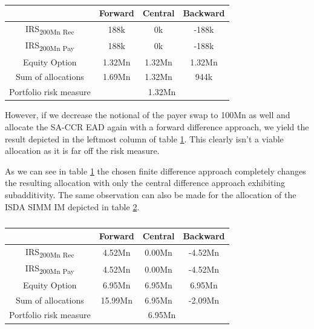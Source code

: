 \documentclass[../Thesis_AHoecherl.tex]{subfiles}
\begin{document}
    \begin{table}[htbp]
        \centering
        \begin{tabular}{c|c|c|c}
            & Forward & Central & Backward \\
            \toprule
            IRS\textsubscript{200Mn Rec} & 188k & 0k & -188k \\
            \midrule
                IRS\textsubscript{200Mn Pay} & 188k & 0k & -188k\\
                \midrule
                Equity Option & 1.32Mn & 1.32Mn & 1.32Mn\\
                \bottomrule
                Sum of allocations & 1.69Mn & 1.32Mn & 944k \\
                \midrule
                Portfolio risk measure & \multicolumn{3}{c}{1.32Mn} \\
            \end{tabular}%
            \caption{}
            \label{tab:EAD perfect hedge}
    \end{table}

    However, if we decrease the notional of the payer swap to 100Mn as well and allocate the SA-CCR EAD again with a forward difference approach, we yield the result depicted in the leftmost column of table \ref{tab:EAD perfect hedge}. This clearly isn't a viable allocation as it is far off the risk measure.
    
    As we can see in table \ref{tab:EAD perfect hedge} the chosen finite difference approach completely changes the resulting allocation with only the central difference approach exhibiting subadditivity.
    The same observation can also be made for the allocation of the ISDA SIMM IM depicted in table \ref{tab:IM perfect hedge}.
    \begin{table}[htbp]
        \centering
        \begin{tabular}{c|c|c|c}
            & Forward & Central & Backward \\
            \toprule
            IRS\textsubscript{200Mn Rec} & 4.52Mn & 0.00Mn & -4.52Mn \\
            \midrule
            IRS\textsubscript{200Mn Pay} & 4.52Mn & 0.00Mn & -4.52Mn \\
            \midrule
            Equity Option & 6.95Mn & 6.95Mn & 6.95Mn \\
            \bottomrule
            Sum of allocations & 15.99Mn & 6.95Mn & -2.09Mn \\
            \midrule
            Portfolio risk measure & \multicolumn{3}{c}{6.95Mn}  \\
        \end{tabular}%
        \caption{}
        \label{tab:IM perfect hedge}
    \end{table}
    
\end{document}

